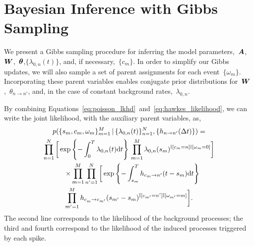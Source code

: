 \section{Bayesian Inference with Gibbs Sampling}
\label{sec:hawkes_inference}
We present a Gibbs sampling procedure for inferring the model
parameters,~$\boldsymbol{A}$,~$\boldsymbol{W}$,~$\boldsymbol{\theta}$,$\{\lambda_{0,n}(t)\}$, and, if
necessary,~${\{c_m\}}$. In order to simplify our Gibbs updates, we
will also sample a set of parent assignments for each
event~$\{\omega_m\}$. Incorporating these parent variables enables
conjugate prior distributions for~$\boldsymbol{W}$,~$\theta_{n \to n'}$, and, in
the case of constant background rates,~$\lambda_{0,n}$.

By combining
Equations~\ref{eq:poisson_lkhd}~and~\ref{eq:hawkes_likelihood}, we can
write the joint likelihood, with the auxiliary parent variables, as,
\begin{multline}
  \label{eq:complete_likelihood}
  p(\{s_m, c_m, \omega_m\}_{m=1}^M \,|\, \{\lambda_{0,n}(t)\}_{n=1}^N, \{h_{n \to n'}(\Delta t)\}) = \\
  \prod^N_{n=1} \bigg[
  \exp\left\{ -\int_0^T \lambda_{0,n}(t)\mathrm{d}t \right\} \,
  \prod^M_{m=1}
   \lambda_{0,n}(s_m)^{\mathbb{I}[c_m=n] \mathbb{I}[\omega_m = 0]} \bigg]\\
  \quad\times \prod_{m=1}^M \prod_{n'=1}^N \bigg[
  \exp\left\{-\int^T_{s_m} h_{c_m \to n'}(t - s_m) \mathrm{d}t \right\} \\
  \prod_{m'=1}^M h_{c_m^{~} \to c_{m'}}(s_{m'}-s_m)^{\mathbb{I}[c_{m'}=n'] \mathbb{I}[\omega_{m'}=m]}\bigg].
\end{multline}
The second line corresponds to the likelihood of the background
processes; the third and fourth correspond to the likelihood of the
induced processes triggered by each spike.

